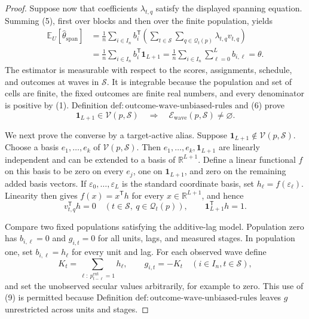 \documentclass{article}
\begin{document}
\begin{proof}
Suppose now that coefficients \(\lambda_{t,q}\) satisfy the displayed spanning equation.  Summing (5), first over blocks and then over the finite population, yields
\[
 \begin{aligned}
 \mathbb E_U[\widehat\theta_{\mathrm{span}}]
 &=\frac1n\sum_{i\in I_n}
   b_i^{\mathsf T}
   \left(\sum_{t\in\mathcal S}\sum_{q\in\mathcal Q_t(p)}
          \lambda_{t,q}v_{t,q}\right)\\
 &=\frac1n\sum_{i\in I_n}b_i^{\mathsf T}\mathbf 1_{L+1}
 =\frac1n\sum_{i\in I_n}\sum_{\ell=0}^{L}b_{i,\ell}
 =\theta.
 \end{aligned}
\tag{6}
\]
The estimator is measurable with respect to the scores, assignments, schedule, and outcomes at waves in \(\mathcal S\).  It is integrable because the population and set of cells are finite, the fixed outcomes are finite real numbers, and every denominator is positive by (1).  Definition \(\mathrm{def:outcome\text{-}wave\text{-}unbiased\text{-}rules}\) and (6) prove
\[
 \mathbf 1_{L+1}\in\mathcal V(p,\mathcal S)
 \quad\Longrightarrow\quad
 \mathcal E_{\mathrm{wave}}(p,\mathcal S)\ne\varnothing.
\tag{7}
\]

We next prove the converse by a target-active alias.  Suppose \(\mathbf 1_{L+1}\notin\mathcal V(p,\mathcal S)\).  Choose a basis \(e_1,\ldots,e_k\) of \(\mathcal V(p,\mathcal S)\).  Then \(e_1,\ldots,e_k,\mathbf 1_{L+1}\) are linearly independent and can be extended to a basis of \(\mathbb R^{L+1}\).  Define a linear functional \(f\) on this basis to be zero on every \(e_j\), one on \(\mathbf 1_{L+1}\), and zero on the remaining added basis vectors.  If \(\varepsilon_0,\ldots,\varepsilon_L\) is the standard coordinate basis, set \(h_\ell=f(\varepsilon_\ell)\).  Linearity then gives \(f(x)=x^{\mathsf T}h\) for every \(x\in\mathbb R^{L+1}\), and hence
\[
 v_{t,q}^{\mathsf T}h=0
 \quad(t\in\mathcal S,\ q\in\mathcal Q_t(p)),
 \qquad
 \mathbf 1_{L+1}^{\mathsf T}h=1.
\tag{8}
\]

Compare two fixed populations satisfying the additive-lag model.  Population zero has \(b_{i,\ell}=0\) and \(g_{i,t}=0\) for all units, lags, and measured stages.  In population one, set \(b_{i,\ell}=h_\ell\) for every unit and lag.  For each observed wave define
\[
 K_t=\sum_{\ell:\ p^{\mathrm{ext}}_{t-\ell}=1}h_\ell,
 \qquad g_{i,t}=-K_t\quad(i\in I_n,t\in\mathcal S),
\tag{9}
\]
and set the unobserved secular values arbitrarily, for example to zero.  This use of (9) is permitted because Definition \(\mathrm{def:outcome\text{-}wave\text{-}unbiased\text{-}rules}\) leaves \(g\) unrestricted across units and stages.


\end{proof}
\end{document}
